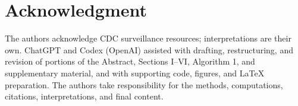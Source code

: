 \documentclass[conference,a4paper]{IEEEtran}
\begin{document}
\section*{Acknowledgment}
The authors acknowledge CDC surveillance resources; interpretations are their own. ChatGPT and Codex (OpenAI) assisted with drafting, restructuring, and revision of portions of the Abstract, Sections I--VI, Algorithm 1, and supplementary material, and with supporting code, figures, and LaTeX preparation. The authors take responsibility for the methods, computations, citations, interpretations, and final content.


\end{document}
